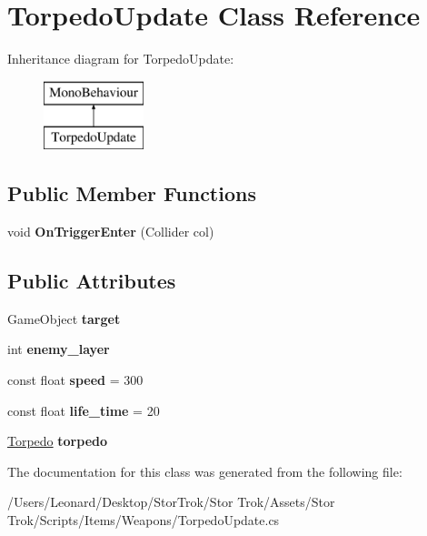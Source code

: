 \hypertarget{class_torpedo_update}{}\section{Torpedo\+Update Class Reference}
\label{class_torpedo_update}
Inheritance diagram for Torpedo\+Update\+:\begin{figure}[H]
\begin{center}
\leavevmode
\includegraphics[height=2.000000cm]{class_torpedo_update}
\end{center}
\end{figure}
\subsection*{Public Member Functions}
\begin{DoxyCompactItemize}
\item 
\mbox{\label{class_torpedo_update_affca6d7e2c47ccc8146f935d82765372}} 
void {\bfseries On\+Trigger\+Enter} (Collider col)
\end{DoxyCompactItemize}
\subsection*{Public Attributes}
\begin{DoxyCompactItemize}
\item 
\mbox{\label{class_torpedo_update_a807877aa4d0147891a9ddf49bb41b7aa}} 
Game\+Object {\bfseries target}
\item 
\mbox{\label{class_torpedo_update_abd5e5eca9801d965a57fbcd3465d8351}} 
int {\bfseries enemy\+\_\+layer}
\item 
\mbox{\label{class_torpedo_update_a200ae21de980c423159f18384bd5b9df}} 
const float {\bfseries speed} = 300
\item 
\mbox{\label{class_torpedo_update_aa5141aafa9b1e3efe7758b7d944809f7}} 
const float {\bfseries life\+\_\+time} = 20
\item 
\mbox{\label{class_torpedo_update_a4029ba84ce6cfa3dbd3ef6c73e3a80f8}} 
\hyperlink{class_torpedo}{Torpedo} {\bfseries torpedo}
\end{DoxyCompactItemize}


The documentation for this class was generated from the following file\+:\begin{DoxyCompactItemize}
\item 
/\+Users/\+Leonard/\+Desktop/\+Stor\+Trok/\+Stor Trok/\+Assets/\+Stor Trok/\+Scripts/\+Items/\+Weapons/Torpedo\+Update.\+cs\end{DoxyCompactItemize}

